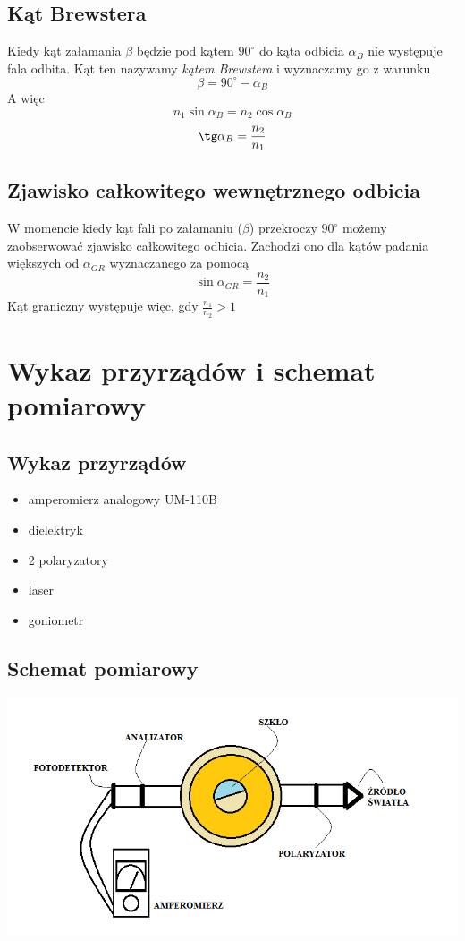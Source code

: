 \documentclass[10pt,a4paper]{article}
\begin{document}
\subsection{Kąt Brewstera}
Kiedy kąt załamania $\beta$ będzie pod kątem $90^\circ$ do kąta odbicia $\alpha_B$ nie występuje fala odbita. Kąt ten nazywamy \emph{kątem Brewstera} i wyznaczamy go z warunku
\begin{equation}
\beta = 90^\circ - \alpha_B
\end{equation} 
A więc
\begin{equation}
n_1\sin\alpha_B = n_2\cos\alpha_B
\end{equation} 
\begin{equation}
\tg\alpha_B = \frac{n_2}{n_1}
\end{equation} 
\subsection{Zjawisko całkowitego wewnętrznego odbicia}
W momencie kiedy kąt fali po załamaniu ($\beta$) przekroczy $90^\circ$ możemy zaobserwować zjawisko całkowitego odbicia. Zachodzi ono dla kątów padania większych od $\alpha_{GR}$ wyznaczanego za pomocą
\begin{equation}
\sin\alpha_{GR} = \frac{n_2}{n_1}
\end{equation} 
Kąt graniczny występuje więc, gdy $\frac{n_1}{n_2}>1$

\section{Wykaz przyrządów i schemat pomiarowy}
\subsection{Wykaz przyrządów}
\begin{itemize}
\item amperomierz analogowy UM-110B
\item dielektryk
\item 2 polaryzatory
\item laser
\item goniometr
\end{itemize}

\subsection{Schemat pomiarowy}
\includegraphics[width=17cm]{schemat3.png}
\end{document}
